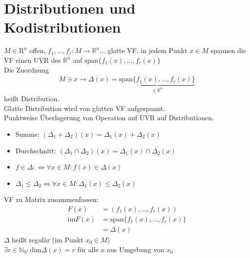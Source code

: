 \documentclass[ngerman]{tudscrreprt}
\begin{document}
\section{Distributionen und Kodistributionen}
$M \in \mathrm{R}^n$ offen, $f_1, \dots, f_r : M\to \mathbb{R}^n \dots $ glatte VF. in jedem Punkt $x\in M $ spannen die VF einen UVR des $\mathbb{R}^n$ auf $\text{span}\{ f_1(x),\dots, f_r(x)\}$ \\ 
Die Zuordnung \begin{align*}
M \ni x \to \Delta(x) = \underbrace{\text{span}\{ f_1(x),\dots,f_r(x) \}}_{\in \mathbb{R}^n}
\end{align*}
heißt Distribution.\\ 
Glatte Distribution wird von glatten VF aufgespannt.\\ 
Punktweise Überlagerung von Operation auf UVR auf Distributionen. 
\begin{itemize}
\item Summe: $(\Delta_1 + \Delta_2)(x) = \Delta_1(x)  + \Delta_2(x)$
\item Durchschnitt: $(\Delta_1 \cap \Delta_2)(x) = \Delta_1(x) \cap \Delta_2(x)$
\item $f \in \Delta: \iff \forall x\in M: f(x) \in \Delta(x)$
\item $\Delta_1 \le \Delta_2 \iff \forall x\in M : \Delta_1(x) \le \Delta_2(x)$\\ 
\end{itemize}
VF zu Matrix zusammenfassen: 
\begin{align*}
F(x) &= (f_1(x),\dots, f_r(x))\\ 
\text{im}F(x) &= \text{span}\{ f_1(x),\dots,f_r(x) \}\\ 
&=\Delta(x)
\end{align*}
$\Delta$ heißt regulär (im Punkt $x_0 \in M$)\\ 
$\exists r \in \mathbb{N}_0: \text{dim}\Delta(x) = r$ für alle $x$ aus Umgebung von $x_0$
\end{document}
